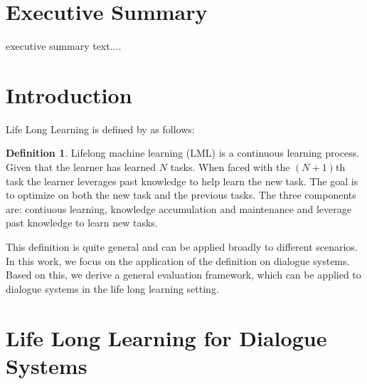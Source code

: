 \documentclass{lihlith}
\theoremstyle{definition}
\newtheorem{definition}{Definition}[section]
\theoremstyle{remark}
\begin{document}


\cleardoublepage
\begin{nwrrevisions}
 \nwrrevision{}{}{}{}{}
 \nwrrevision{}{}{}{}{}
\end{nwrrevisions}

\cleardoublepage
\section*{Executive Summary}

executive summary text....


\cleardoublepage
\tableofcontents
\cleardoublepage



\section{Introduction}
\label{sec:introduction}

Life Long Learning is defined by \cite{chen2016lifelong} as follows: 

\theoremstyle{definition}
\begin{definition}{Lifelong machine learning (LML)} is a continuous learning process. Given that the learner has learned $N$ tasks. When faced with the $(N+1)$th task the learner leverages past knowledge to help learn the new task. The goal is to optimize on both the new task and the previous tasks. The three components are: contiuous learning, knowledge accumulation and maintenance and leverage past knowledge to learn new tasks. 
\end{definition}
This definition is quite general and can be applied broadly to different scenarios. In this work, we focus on the application of the definition on dialogue systems. Based on this, we derive a general evaluation framework, which can be applied to dialogue systems in the life long learning setting. 


\section{Life Long Learning for Dialogue Systems}
\label{sec:lll4ds}
\end{document}
